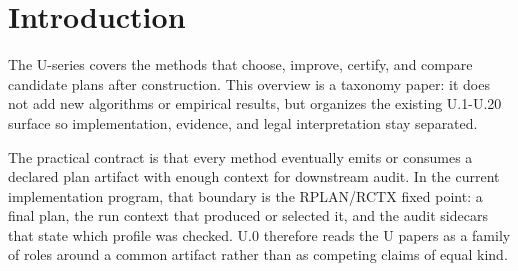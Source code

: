 \section{Introduction}

The U-series covers the methods that choose, improve, certify, and compare
candidate plans after construction. This overview is a taxonomy paper: it does
not add new algorithms or empirical results, but organizes the existing U.1-U.20
surface so implementation, evidence, and legal interpretation stay separated.

The practical contract is that every method eventually emits or consumes a
declared plan artifact with enough context for downstream audit. In the current
implementation program, that boundary is the RPLAN/RCTX fixed point: a final
plan, the run context that produced or selected it, and the audit sidecars that
state which profile was checked. U.0 therefore reads the U papers as a family
of roles around a common artifact rather than as competing claims of equal kind.
